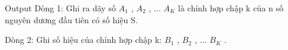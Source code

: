 Output
Dòng 1: Ghi ra dãy số $A_{1}$   , $A_{2}$   , ... $A_{K}$   là chỉnh hợp chập k của n số nguyên dương đầu tiên có số hiệu S.  

   Dòng 2: Ghi số hiệu của chỉnh hợp chập k: $B_{1}$   , $B_{2}$   , ... $B_{K}$   .
